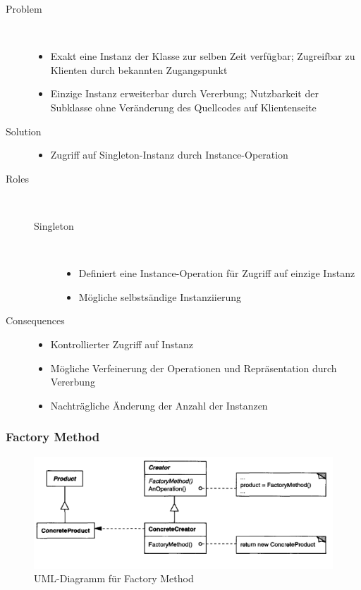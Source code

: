 \begin{description}
    \item[Problem] \hfill \\
    \begin{itemize}
        \item Exakt eine Instanz der Klasse zur selben Zeit verfügbar; Zugreifbar zu Klienten durch bekannten Zugangspunkt
        \item Einzige Instanz erweiterbar durch Vererbung; Nutzbarkeit der Subklasse ohne Veränderung des Quellcodes auf Klientenseite
    \end{itemize}
    \item[Solution] \hfill
    \begin{itemize}
        \item   Zugriff auf Singleton-Instanz durch Instance-Operation
    \end{itemize}
    \item[Roles] \hfill \\
    \begin{description}
        \item[Singleton] \hfill \\
        \begin{itemize}
            \item Definiert eine Instance-Operation für Zugriff auf einzige Instanz
            \item Mögliche selbstsändige Instanziierung
        \end{itemize}
    \end{description}
    \item[Consequences]  \hfill 
    \begin{itemize}
        \item Kontrollierter Zugriff auf Instanz
        \item Mögliche Verfeinerung der Operationen und Repräsentation durch Vererbung
        \item Nachträgliche Änderung der Anzahl der Instanzen 
    \end{itemize}
\end{description}

\subsubsection{Factory Method}

\begin{figure}[h]
    \centering
    \includegraphics[scale=0.8]{figures/factory.png}
    \caption{UML-Diagramm für Factory Method}
    \label{fig:factory}
\end{figure}

